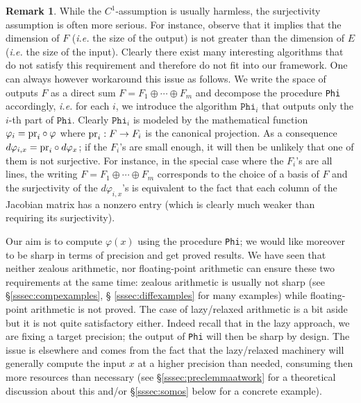 \documentclass[11pt]{article}
\numberwithin{equation}{section}
\numberwithin{figure}{section}
\theoremstyle{definition}
\newtheorem{rem}[theo]{Remark}
\newcommand{\pr}{\text{\rm pr}}
\begin{document}
\begin{rem}
While the $C^1$-assumption is usually harmless, the surjectivity
assumption is often more serious. 
For instance, observe that it implies that the dimension of $F$ 
(\emph{i.e.} the size of the output) is not greater than the dimension 
of $E$ (\emph{i.e.} the size of the input). Clearly there exist many 
interesting algorithms that do not satisfy this requirement and 
therefore do not fit into our framework.
One can always however workaround this issue as follows. We write the 
space of outputs $F$ as a direct sum $F = F_1 \oplus \cdots \oplus F_m$ 
and decompose the procedure \texttt{Phi} accordingly, \emph{i.e.} for 
each $i$, we introduce the algorithm $\texttt{Phi}_i$ that outputs only 
the $i$-th part of $\texttt{Phi}$. Clearly $\texttt{Phi}_i$ is modeled 
by the mathematical function $\varphi_i = \pr_i \circ \varphi$ where 
$\pr_i : F \to F_i$ is the canonical projection. As a consequence 
$d\varphi_{i,x} = \pr_i \circ d \varphi_x$; if the $F_i$'s are small 
enough, it will then be unlikely that one of them is not surjective.
For instance, in the special case where the $F_i$'s are all lines,
the writing $F = F_1 \oplus \cdots \oplus F_m$ corresponds to the
choice of a basis of $F$ and the surjectivity of the $d\varphi_{i,x}$'s
is equivalent to the fact that each column of the Jacobian matrix has
a nonzero entry (which is clearly much weaker than requiring its
surjectivity).
\end{rem}

Our aim is to compute $\varphi(x)$ using the procedure \texttt{Phi}; we 
would like moreover to be sharp in terms of precision and get proved results. We 
have seen that neither zealous arithmetic, nor floating-point arithmetic 
can ensure these two requirements at the same time: zealous arithmetic is 
usually not sharp (see \S \ref{sssec:compexamples}, \S 
\ref{sssec:diffexamples} for many examples) while floating-point 
arithmetic is not proved.
The case of lazy/relaxed arithmetic is a bit aside but it is not quite 
satisfactory either. Indeed recall that in the lazy approach, we are 
fixing a target precision; the output of \texttt{Phi} will then be sharp 
by design. The issue is elsewhere and comes from the fact that the 
lazy/relaxed machinery will generally compute the input $x$ at a higher 
precision than needed, consuming then more resources than necessary (see 
\S \ref{sssec:preclemmaatwork} for a theoretical discussion about this
and/or \S \ref{sssec:somos} below for a concrete example).
\end{document}
